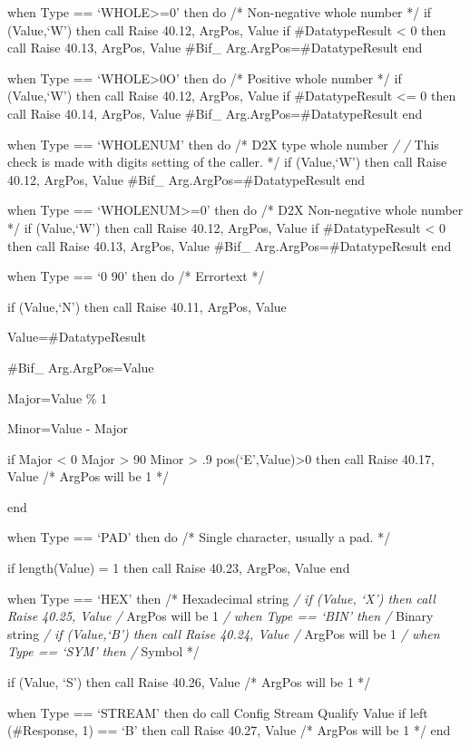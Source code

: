 when Type == `WHOLE\textgreater=0' then do /* Non-negative whole number
*/ if \Edatatype(Value,`W') then call Raise 40.12, ArgPos, Value if
\#DatatypeResult \textless{} 0 then call Raise 40.13, ArgPos, Value
\#Bif\_ Arg.ArgPos=\#DatatypeResult end

when Type == `WHOLE\textgreater0O' then do /* Positive whole number */
if \Edatatype(Value,`W') then call Raise 40.12, ArgPos, Value if
\#DatatypeResult \textless= 0 then call Raise 40.14, ArgPos, Value
\#Bif\_ Arg.ArgPos=\#DatatypeResult end

when Type == `WHOLENUM' then do /* D2X type whole number \emph{/ /} This
check is made with digits setting of the caller. */ if
\Cdatatype(Value,`W') then call Raise 40.12, ArgPos, Value \#Bif\_
Arg.ArgPos=\#DatatypeResult end

when Type == `WHOLENUM\textgreater=0' then do /* D2X Non-negative whole
number */ if \Cdatatype(Value,`W') then call Raise 40.12, ArgPos, Value
if \#DatatypeResult \textless{} 0 then call Raise 40.13, ArgPos, Value
\#Bif\_ Arg.ArgPos=\#DatatypeResult end

when Type == `0 90' then do /* Errortext */

if \Edatatype(Value,`N') then call Raise 40.11, ArgPos, Value

Value=\#DatatypeResult

\#Bif\_ Arg.ArgPos=Value

Major=Value \% 1

Minor=Value - Major

if Major \textless{} 0 \textbar{} Major \textgreater{} 90 \textbar{}
Minor \textgreater{} .9 \textbar{} pos(`E',Value)\textgreater0 then call
Raise 40.17, Value /* ArgPos will be 1 */

end

when Type == `PAD' then do /* Single character, usually a pad. */

if length(Value) = 1 then call Raise 40.23, ArgPos, Value end

when Type == `HEX' then /* Hexadecimal string \emph{/ if
\datatype (Value, `X') then call Raise 40.25, Value /} ArgPos will be 1
\emph{/ when Type == `BIN' then /} Binary string \emph{/ if
\datatype(Value,`B') then call Raise 40.24, Value /} ArgPos will be 1
\emph{/ when Type == `SYM' then /} Symbol */

if \datatype (Value, `S') then call Raise 40.26, Value /* ArgPos will be
1 */

when Type == `STREAM' then do call Config Stream Qualify Value if left
(\#Response, 1) == `B' then call Raise 40.27, Value /* ArgPos will be 1
*/ end

